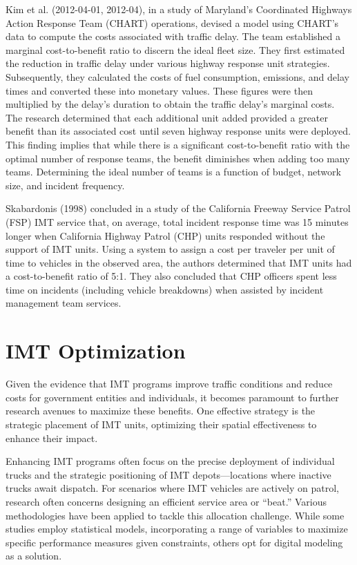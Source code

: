 \documentclass[fancy, oneside, mastersfancy, ms]{byuthesis}
\begin{document}
Kim et al. (2012-04-01, 2012-04), in a study of Maryland's Coordinated
Highways Action Response Team (CHART) operations, devised a model using
CHART's data to compute the costs associated with traffic delay. The
team established a marginal cost-to-benefit ratio to discern the ideal
fleet size. They first estimated the reduction in traffic delay under
various highway response unit strategies. Subsequently, they calculated
the costs of fuel consumption, emissions, and delay times and converted
these into monetary values. These figures were then multiplied by the
delay's duration to obtain the traffic delay's marginal costs. The
research determined that each additional unit added provided a greater
benefit than its associated cost until seven highway response units were
deployed. This finding implies that while there is a significant
cost-to-benefit ratio with the optimal number of response teams, the
benefit diminishes when adding too many teams. Determining the ideal
number of teams is a function of budget, network size, and incident
frequency.

Skabardonis (1998) concluded in a study of the California Freeway
Service Patrol (FSP) IMT service that, on average, total incident
response time was 15 minutes longer when California Highway Patrol (CHP)
units responded without the support of IMT units. Using a system to
assign a cost per traveler per unit of time to vehicles in the observed
area, the authors determined that IMT units had a cost-to-benefit ratio
of 5:1. They also concluded that CHP officers spent less time on
incidents (including vehicle breakdowns) when assisted by incident
management team services.~

\hypertarget{imt-optimization}{%
\section{IMT Optimization}\label{imt-optimization}}

Given the evidence that IMT programs improve traffic conditions and
reduce costs for government entities and individuals, it becomes
paramount to further research avenues to maximize these benefits. One
effective strategy is the strategic placement of IMT units, optimizing
their spatial effectiveness to enhance their impact.

Enhancing IMT programs often focus on the precise deployment of
individual trucks and the strategic positioning of IMT
depots---locations where inactive trucks await dispatch. For scenarios
where IMT vehicles are actively on patrol, research often concerns
designing an efficient service area or ``beat.'' Various methodologies
have been applied to tackle this allocation challenge. While some
studies employ statistical models, incorporating a range of variables to
maximize specific performance measures given constraints, others opt for
digital modeling as a solution.
\end{document}
